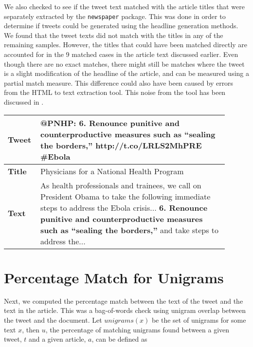 We also checked to see if the tweet text matched with the article titles that were separately extracted by the \texttt{newspaper} package. This was done in order to determine if tweets could be generated using the headline generation methods. We found that the tweet texts did not match with the titles in any of the remaining samples. However, the titles that could have been matched directly are accounted for in the 9 matched cases in the article text discussed earlier. Even though there are no exact matches, there might still be matches where the tweet is a slight modification of the headline of the article, and can be measured using a partial match measure. This difference could also have been caused by errors from the HTML to text extraction tool. This noise from the tool has been discussed in . 

\begin{table}[!t]
\centering
\begin{tabular}{|p{0.1\linewidth}|p{0.8\linewidth}|}
\hline
\textbf{Tweet} &  @PNHP: \textbf{6. Renounce punitive and counterproductive measures such as “sealing the borders,”} http://t.co/LRLS2MhPRE \#Ebola \\ \hline
\textbf{Title} & Physicians for a National Health Program \\  \hline
\textbf{Text}  & As health professionals and trainees, we call on President Obama to take the following immediate steps to address the Ebola crisis... \textbf{6. Renounce punitive and counterproductive measures such as “sealing the borders,”} and take steps to address the... \\ \hline
\end{tabular}
\label{tab:fullextract}
\end{table}


\section{Percentage Match for Unigrams}
\label{sec:unigrams}

Next, we computed the percentage match between the text of the tweet and the text in the article. This was a bag-of-words check using unigram overlap between the tweet and the document. Let $\textit{unigrams}(x)$ be the set of unigrams for some text $x$, then $u$, the percentage of matching unigrams found between a given tweet, $t$ and a given article, $a$, can be defined as  

